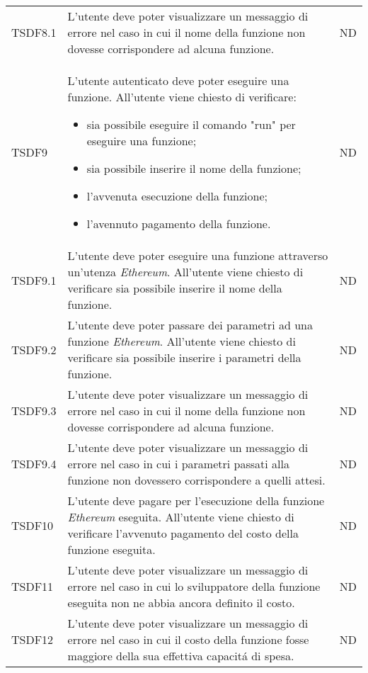 \begin{longtable}{|C{2cm}|C{8cm}|C{2cm}|}
	TSDF8.1  &
	L’utente deve poter visualizzare un messaggio di errore nel caso in cui il nome della funzione non dovesse corrispondere ad alcuna funzione. &
	ND \\
	
	TSDF9  &
	L’utente autenticato deve poter eseguire una funzione. All’utente viene chiesto di verificare:
	\begin{itemize}
		\item sia possibile eseguire il comando "run" per eseguire una funzione;
		\item sia possibile inserire il nome della funzione;
		\item l'avvenuta esecuzione della funzione;
		\item l'avennuto pagamento della funzione.
	\end{itemize} &
	ND \\
	
	TSDF9.1  &
	L’utente deve poter eseguire una funzione attraverso un'utenza \textit{Ethereum\glos}. All’utente viene chiesto di verificare sia possibile inserire il nome della funzione. &
	ND \\
	
	TSDF9.2  &
	L’utente deve poter passare dei parametri ad una funzione \textit{Ethereum\glos}. All’utente viene chiesto di verificare sia possibile inserire i parametri della funzione. &
	ND \\
	
	TSDF9.3  &
	L’utente deve poter visualizzare un messaggio di errore nel caso in cui il nome della funzione non dovesse corrispondere ad alcuna funzione. &
	ND \\
	
	TSDF9.4  &
	L’utente deve poter visualizzare un messaggio di errore nel caso in cui i parametri passati alla funzione non dovessero corrispondere a quelli attesi. &
	ND \\
	
	TSDF10  &
	L’utente deve pagare per l'esecuzione della funzione \textit{Ethereum\glos} eseguita.
	All’utente viene chiesto di verificare l'avvenuto pagamento del costo della funzione eseguita. &
	ND \\
	
	TSDF11  &
	L’utente deve poter visualizzare un messaggio di errore nel caso in cui lo sviluppatore della funzione eseguita non ne abbia ancora definito il costo. &
	ND \\
	
	TSDF12  &
	L’utente deve poter visualizzare un messaggio di errore nel caso in cui il costo della funzione fosse maggiore della sua effettiva capacitá di spesa. &
	ND \\
	

\end{longtable}
